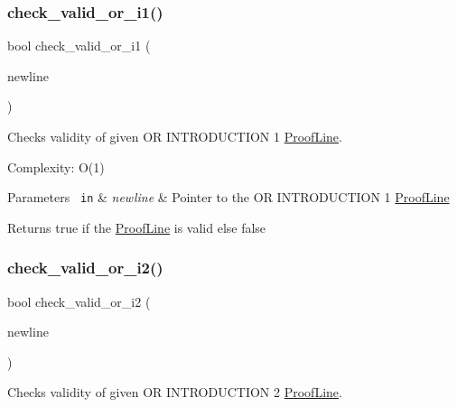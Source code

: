 \subsubsection{\texorpdfstring{check\+\_\+valid\+\_\+or\+\_\+i1()}{check\_valid\_or\_i1()}}
{\footnotesize\ttfamily bool check\+\_\+valid\+\_\+or\+\_\+i1 (\begin{DoxyParamCaption}\item[{\mbox{\hyperlink{classProofLine}{Proof\+Line}} $\ast$}]{newline }\end{DoxyParamCaption})\hspace{0.3cm}{\ttfamily [related]}}



Checks validity of given OR I\+N\+T\+R\+O\+D\+U\+C\+T\+I\+ON 1 \mbox{\hyperlink{classProofLine}{Proof\+Line}}. 

Complexity\+: O(1) 
\begin{DoxyParams}[1]{Parameters}
\mbox{\texttt{ in}}  & {\em newline} & Pointer to the OR I\+N\+T\+R\+O\+D\+U\+C\+T\+I\+ON 1 \mbox{\hyperlink{classProofLine}{Proof\+Line}} \\
\hline
\end{DoxyParams}
\begin{DoxyReturn}{Returns}
true if the \mbox{\hyperlink{classProofLine}{Proof\+Line}} is valid else false 
\end{DoxyReturn}
\mbox{\label{classProofLine_abe95433e64d9bc565b87ccd6161a5db9}} 
\subsubsection{\texorpdfstring{check\+\_\+valid\+\_\+or\+\_\+i2()}{check\_valid\_or\_i2()}}
{\footnotesize\ttfamily bool check\+\_\+valid\+\_\+or\+\_\+i2 (\begin{DoxyParamCaption}\item[{\mbox{\hyperlink{classProofLine}{Proof\+Line}} $\ast$}]{newline }\end{DoxyParamCaption})\hspace{0.3cm}{\ttfamily [related]}}



Checks validity of given OR I\+N\+T\+R\+O\+D\+U\+C\+T\+I\+ON 2 \mbox{\hyperlink{classProofLine}{Proof\+Line}}. 

